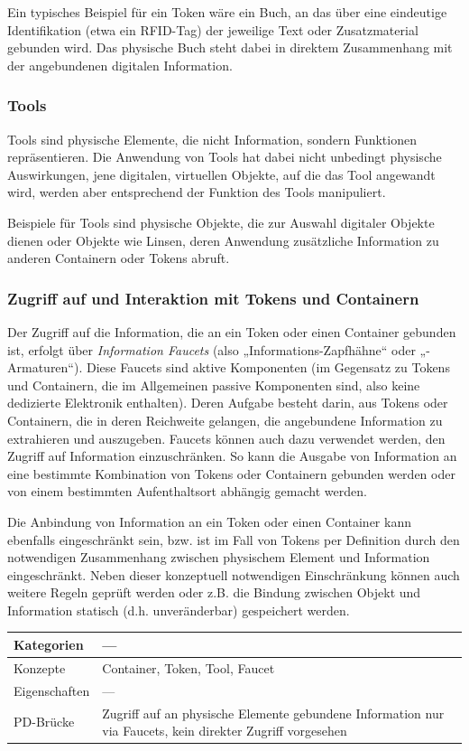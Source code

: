 Ein typisches Beispiel für ein Token wäre ein Buch, an das über eine eindeutige Identifikation (etwa ein \gls{RFID}-Tag) der jeweilige Text oder Zusatzmaterial gebunden wird. Das physische Buch steht dabei in direktem Zusammenhang mit der angebundenen digitalen Information.

\subsubsection{Tools}
Tools sind physische Elemente, die nicht Information, sondern Funktionen repräsentieren. Die Anwendung von Tools hat dabei nicht unbedingt physische Auswirkungen, jene digitalen, virtuellen Objekte, auf die das Tool angewandt wird, werden aber entsprechend der Funktion des Tools manipuliert.

Beispiele für Tools sind physische Objekte, die zur Auswahl digitaler Objekte dienen oder Objekte wie Linsen, deren Anwendung zusätzliche Information zu anderen Containern oder Tokens abruft.

\subsubsection{Zugriff auf und Interaktion mit Tokens und Containern}

Der Zugriff auf die Information, die an ein Token oder einen Container gebunden ist, erfolgt über \emph{Information Faucets} (also „Informations-Zapfhähne“ oder „-Armaturen“). Diese Faucets sind aktive Komponenten (im Gegensatz zu Tokens und Containern, die im Allgemeinen passive Komponenten sind, also keine dedizierte Elektronik enthalten). Deren Aufgabe besteht darin, aus Tokens oder Containern, die in deren Reichweite gelangen, die angebundene Information zu extrahieren und auszugeben. Faucets können auch dazu verwendet werden, den Zugriff auf Information einzuschränken. So kann die Ausgabe von Information an eine bestimmte Kombination von Tokens oder Containern gebunden werden oder von einem bestimmten Aufenthaltsort abhängig gemacht werden.

Die Anbindung von Information an ein Token oder einen Container kann ebenfalls eingeschränkt sein, bzw. ist im Fall von Tokens per Definition durch den notwendigen Zusammenhang zwischen physischem Element und Information eingeschränkt. Neben dieser konzeptuell notwendigen Einschränkung können auch weitere Regeln geprüft werden oder z.B. die Bindung zwischen Objekt und Information statisch (d.h. unveränderbar) gespeichert werden. 
\\[1em]
\begin{tabular}{| p{3cm} | p{10cm} |}
  \hline
  Kategorien & --- \\ \hline
  Konzepte & Container, Token, Tool, Faucet \\ \hline
  Eigenschaften & --- \\ \hline
  PD-Brücke & Zugriff auf an physische Elemente gebundene Information nur via Faucets, kein direkter Zugriff vorgesehen \\ \hline
\end{tabular} 

